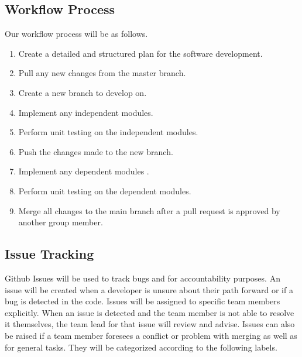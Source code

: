 \documentclass{article}
\begin{document}
\subsection{Workflow Process}

Our workflow process will be as follows.

\begin{enumerate}
\item Create a detailed and structured plan for the software development. 
\item Pull any new changes from the master branch. 
\item Create a new branch to develop on. 
\item Implement any independent modules. 
\item Perform unit testing on the independent modules. 
\item Push the changes made to the new branch.  
\item Implement any dependent modules .
\item Perform unit testing on the dependent modules.  
\item Merge all changes to the main branch after a pull request is approved by another group member.  
\end{enumerate}

\subsection{Issue Tracking}

Github Issues will be used to track bugs and for accountability purposes. An issue will be created when a developer is unsure about their path forward or if a bug is detected in the code. Issues will be assigned to specific team members explicitly. When an issue is detected and the team member is not able to resolve it themselves, the team lead for that issue will review and advise. Issues can also be raised if a team member foresees a conflict or problem with merging as well as for general tasks. 
\bigskip
They will be categorized according to the following labels.
\end{document}
